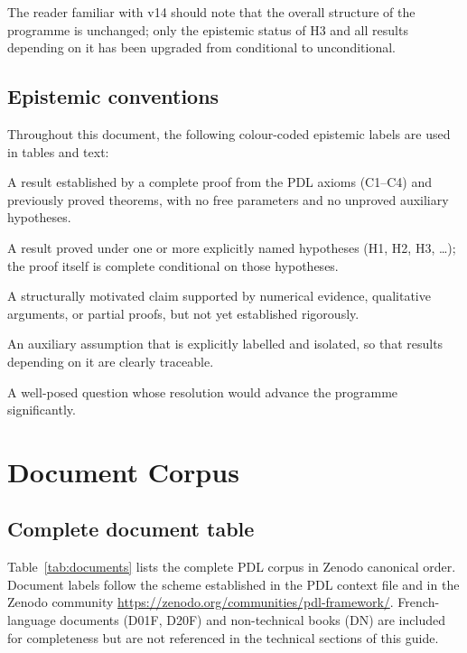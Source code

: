 \documentclass[11pt,a4paper]{article}
\theoremstyle{plain}
\theoremstyle{definition}
\theoremstyle{remark}
\begin{document}
The reader familiar with v14 should note that the overall structure of the programme is unchanged; only the epistemic status of H3 and all results depending on it has been upgraded from conditional to unconditional.

\subsection{Epistemic conventions}
\label{subsec:conventions}

Throughout this document, the following colour-coded epistemic labels are used in tables and text:
\begin{description}[leftmargin=2.5cm,style=nextline]
\item[\textcolor{proofblue}{Theorem}] A result established by a complete proof from the PDL axioms (C1--C4) and previously proved theorems, with no free parameters and no unproved auxiliary hypotheses.
\item[\textcolor{proofblue}{Theorem (H)}] A result proved under one or more explicitly named hypotheses (H1, H2, H3, \ldots); the proof itself is complete conditional on those hypotheses.
\item[\textcolor{conjecturegreen}{Conjecture}] A structurally motivated claim supported by numerical evidence, qualitative arguments, or partial proofs, but not yet established rigorously.
\item[\textcolor{hypothesisorange}{Named Hypothesis}] An auxiliary assumption that is explicitly labelled and isolated, so that results depending on it are clearly traceable.
\item[\textcolor{openproblemred}{Open Problem}] A well-posed question whose resolution would advance the programme significantly.
\end{description}

\section{Document Corpus}
\label{sec:corpus}

\subsection{Complete document table}
\label{subsec:doc_table}

Table~\ref{tab:documents} lists the complete PDL corpus in Zenodo canonical order.
Document labels follow the scheme established in the PDL context file and in the Zenodo community \url{https://zenodo.org/communities/pdl-framework/}.
French-language documents (D01F, D20F) and non-technical books (DN) are included for completeness but are not referenced in the technical sections of this guide.
\end{document}

